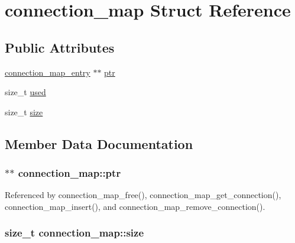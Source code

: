 \hypertarget{structconnection__map}{\section{connection\-\_\-map Struct Reference}
\label{structconnection__map}
}
\subsection*{Public Attributes}
\begin{DoxyCompactItemize}
\item 
\hyperlink{structconnection__map__entry}{connection\-\_\-map\-\_\-entry} $\ast$$\ast$ \hyperlink{structconnection__map_a3a89c2f931084ce505302de76b723ff4}{ptr}
\item 
size\-\_\-t \hyperlink{structconnection__map_a2134cc87d079932ee2892870c6369a11}{used}
\item 
size\-\_\-t \hyperlink{structconnection__map_a599ff4c37c42ab8b6fe87e9803e49f64}{size}
\end{DoxyCompactItemize}


\subsection{Member Data Documentation}
\hypertarget{structconnection__map_a3a89c2f931084ce505302de76b723ff4}{
\subsubsection[{ptr}]{$\ast$$\ast$ connection\-\_\-map\-::ptr}}\label{structconnection__map_a3a89c2f931084ce505302de76b723ff4}


Referenced by connection\-\_\-map\-\_\-free(), connection\-\_\-map\-\_\-get\-\_\-connection(), connection\-\_\-map\-\_\-insert(), and connection\-\_\-map\-\_\-remove\-\_\-connection().

\hypertarget{structconnection__map_a599ff4c37c42ab8b6fe87e9803e49f64}{
\subsubsection[{size}]{\setlength{\rightskip}{0pt plus 5cm}size\-\_\-t connection\-\_\-map\-::size}}\label{structconnection__map_a599ff4c37c42ab8b6fe87e9803e49f64}


